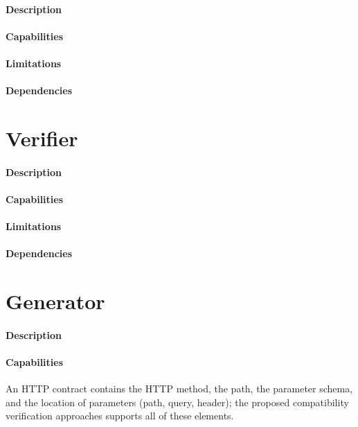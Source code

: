 \newpage

\paragraph{Description}
\paragraph{Capabilities}
\paragraph{Limitations}
\paragraph{Dependencies}

\section{Verifier} %
\label{sec:verifier}

\paragraph{Description}
\paragraph{Capabilities}
\paragraph{Limitations}
\paragraph{Dependencies}

\section{Generator} %
\label{sec:generator}

\paragraph{Description}
\paragraph{Capabilities}
An HTTP contract contains the HTTP method, the
path, the parameter schema, and the location of parameters (path, query, header); the
proposed compatibility verification approaches supports all of these elements.

